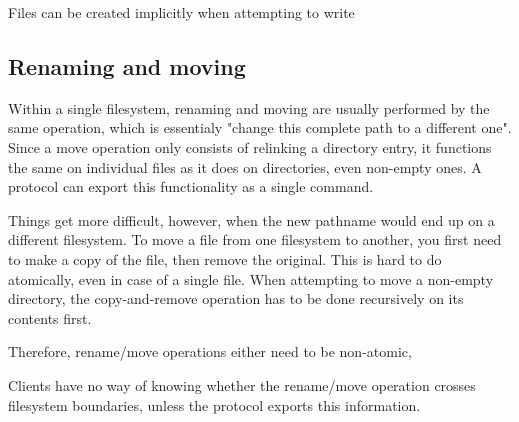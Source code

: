 Files can be created implicitly when attempting to write 

\subsection{Renaming and moving}

Within a single filesystem, renaming and moving are usually performed by the same operation, which is
essentialy "change this complete path to a different one". Since a move operation only consists of relinking
a directory entry, it functions the same on individual files as it does on directories, even non-empty ones.
A protocol can export this functionality as a single command.

Things get more difficult, however, when the new pathname would end up on a different filesystem. To move
a file from one filesystem to another, you first need to make a copy of the file, then remove the original.
This is hard to do atomically, even in case of a single file. When attempting to move a non-empty directory,
the copy-and-remove operation has to be done recursively on its contents first.

Therefore, rename/move operations either need to be non-atomic, 

Clients have no way of knowing whether the rename/move operation crosses filesystem boundaries, unless the
protocol exports this information.
